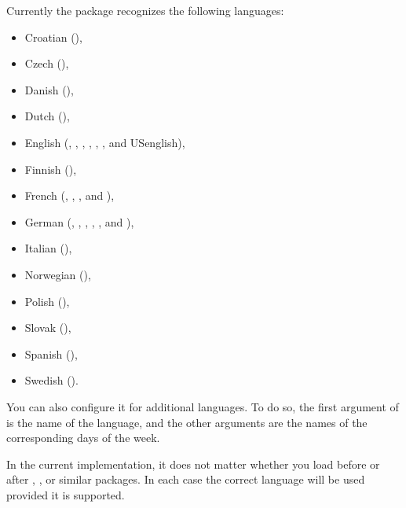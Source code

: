 \begin{Declaration}
\end{Declaration}
Currently the  package recognizes the following languages:
\begin{itemize}\setlength{\itemsep}{.5\itemsep}
\item Croatian (),
\item Czech (),
\item Danish (),
\item Dutch (),
\item English (,
  , , , ,
  , and USenglish),
\item Finnish (),
\item French (, ,
  , and ),
\item German (,
  , , ,
  , and
  ),
\item Italian (),
\item Norwegian (),
\item Polish (),
\item Slovak (),
\item Spanish (),
\item Swedish ().
\end{itemize}
You can also configure it for additional languages. To do so, the first
argument of  is the name of the language, and the other
arguments are the names of the corresponding days of the week.

In the current implementation, it does not matter whether you load
 before or after ,
, or similar packages. In each case the
correct language will be used provided it is supported.

